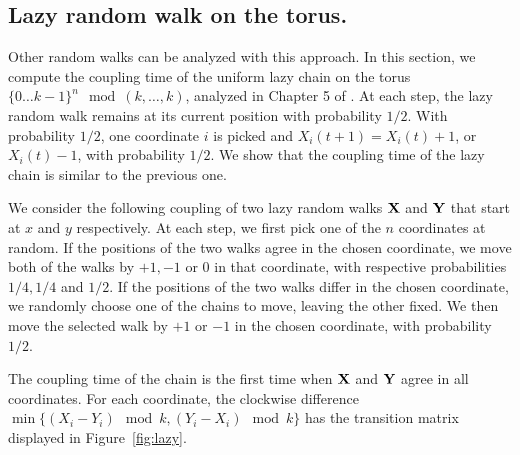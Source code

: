 \documentclass{aptpub}
\begin{document}
\subsection{Lazy random walk on the torus.}

Other random walks can be analyzed with this approach. In this
section, we compute the coupling time of the uniform lazy chain on the
torus $\{0\dots k-1\}^n \mod (k,\dots,k)$, analyzed in Chapter 5 of
\cite{peres}. At each step, the lazy random walk remains at its
current position with probability $1/2$. With probability $1/2$, one
coordinate $i$ is picked and $X_i(t+1) = X_i(t)+1$, or $X_i(t)-1$,  with probability
$1/2$.  We show that the coupling time of the lazy chain is similar to
 the previous one.

We consider the following coupling of two lazy random walks $\bf X$ and
$\bf Y$ that start at $x$ and $y$ respectively. At each step, we first pick one of
the $n$ coordinates at random. If the positions of the two walks agree
in the chosen coordinate, we move both of the walks by $+1, -1$ or $0$
in that coordinate, with respective probabilities $1/4, 1/4$ and
$1/2$. If the positions of the two walks differ in the chosen
coordinate, we randomly choose one of the chains to move, leaving the
other fixed. We then move the selected walk by $+1$ or $-1$ in the
chosen coordinate, with probability $1/2$.

The coupling time of the chain is the first time when $\bf X$ and $\bf Y$ agree in
all coordinates.  For each coordinate, the clockwise difference
$\min \{ (X_i - Y_i) \mod k, (Y_i - X_i) \mod k \}$ has the transition
matrix displayed in Figure~\ref{fig:lazy}.
\end{document}
